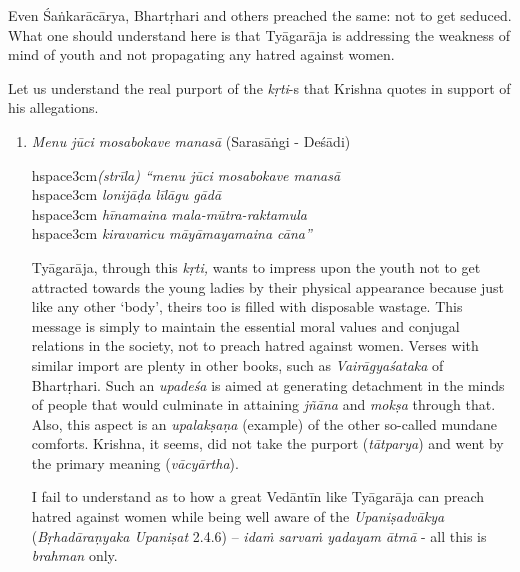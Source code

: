 Even Śaṅkarācārya, Bhartṛhari and others preached the same: not to get seduced. What one should understand here is that Tyāgarāja is addressing the weakness of mind of youth and not propagating any hatred against women.

Let us understand the real purport of the \textit{kṛti}-s that Krishna quotes in support of his allegations.

\begin{enumerate}
\itemsep=0pt
\item 
 \textit{Menu jūci mosabokave manasā} (Sarasāṅgi - Deśādi)

\begin{myquote}
hspace{3cm}\textit{(strīla) “menu jūci mosabokave manasā}\\hspace{3cm} \textit{lonijāḍa līlāgu gādā}\\hspace{3cm} \textit{hīnamaina mala-mūtra-raktamula}\\hspace{3cm} \textit{kiravaṁcu māyāmayamaina cāna”}
\end{myquote}

 Tyāgarāja, through this \textit{kṛti,} wants to impress upon the youth not to get attracted towards the young ladies by their physical appearance because just like any other ‘body’, theirs too is filled with disposable wastage. This message is simply to maintain the essential moral values and conjugal relations in the society, not to preach hatred against women. Verses with similar import are plenty in other books, such as \textit{Vairāgyaśataka} of Bhartṛhari. Such an \textit{upadeśa} is aimed at generating detachment in the minds of people that would culminate in attaining \textit{jñāna} and \textit{mokṣa} through that. Also, this aspect is an \textit{upalakṣaṇa} (example) of the other so-called mundane comforts. Krishna, it seems, did not take the purport (\textit{tātparya}) and went by the primary meaning (\textit{vācyārtha}).

 I fail to understand as to how a great Vedāntīn like Tyāgarāja can preach hatred against women while being well aware of the \textit{Upaniṣadvākya} (\textit{Bṛhadāraṇyaka Upaniṣat} 2.4.6) – \textit{idaṁ sarvaṁ yadayam ātmā} - all this is \textit{brahman} only.


\end{enumerate}
